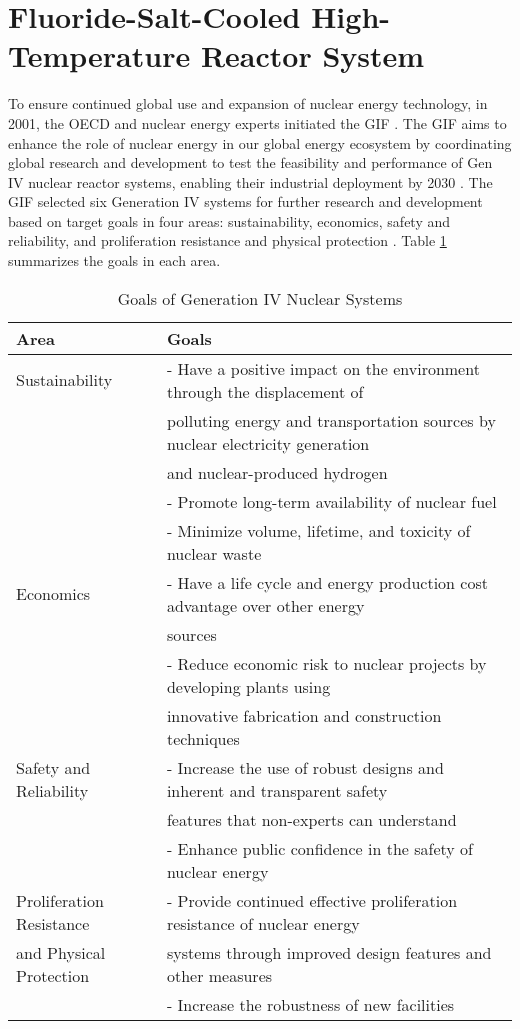 \section{Fluoride-Salt-Cooled High-Temperature Reactor System}
\label{sec:fhr}
To ensure continued global use and expansion of nuclear energy technology, in 
2001, the \gls{OECD} and nuclear energy experts initiated the \gls{GIF} 
\cite{gif_technology_2002}.
The \gls{GIF} aims to enhance the role of nuclear energy in our global energy 
ecosystem by coordinating global research and development to test the 
feasibility and performance of Gen IV nuclear reactor systems, enabling 
their industrial deployment by 2030 \cite{gif_technology_2002}.
The \gls{GIF} selected six Generation IV systems for further research and 
development based on target goals in four areas: sustainability, 
economics, safety and reliability, and proliferation resistance and physical 
protection \cite{gif_technology_2002}. 
Table \ref{tab:goals-gen4} summarizes the goals in each area. 
\begin{table}[btp]
    \centering
    \onehalfspacing
    \caption{Goals of Generation IV Nuclear Systems \cite{gif_technology_2002,
    behar_technology_2014}}
	\label{tab:goals-gen4}
    \footnotesize
    \begin{tabular}{l|l}
    \hline
                               \textbf{Area} & \textbf{Goals} \\ \hline
    Sustainability   & - Have a positive impact on the environment through the displacement of \\
    & polluting energy and transportation sources by nuclear electricity generation \\
    & and nuclear-produced hydrogen \\ 
    & - Promote long-term availability of nuclear fuel \\
    & - Minimize volume, lifetime, and toxicity of nuclear waste \\ \hline
    Economics & - Have a life cycle and energy production cost advantage over other energy \\
    & sources \\ 
    & - Reduce economic risk to nuclear projects by developing plants using \\
    & innovative fabrication and construction techniques \\ \hline
    Safety and Reliability   & - Increase the use of robust designs and inherent and transparent safety\\
    & features that non-experts can understand \\ 
    & - Enhance public confidence in the safety of nuclear energy \\\hline
    Proliferation Resistance & - Provide continued effective proliferation resistance of nuclear energy \\
    and Physical Protection & systems through improved design features and other measures \\ 
    & - Increase the robustness of new facilities \\ \hline
    \end{tabular}
\end{table}
